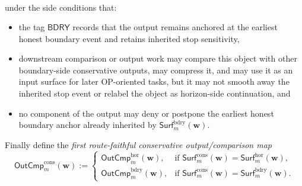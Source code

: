 \begin{definition}
\begin{enumerate}[label=(\roman*)]
\[\begin{aligned}
 \end{aligned}
 \]
 under the side conditions that:
 \begin{itemize}[leftmargin=2em]
 \item the tag \(\mathsf{BDRY}\) records that the output remains anchored at the earliest honest boundary event and retains inherited stop sensitivity,
 \item downstream comparison or output work may compare this object with other boundary-side conservative outputs, may compress it, and may use it as an input surface for later OP-oriented tasks, but it may not smooth away the inherited stop event or relabel the object as horizon-side continuation, and
 \item no component of the output may deny or postpone the earliest honest boundary anchor already inherited by \(\mathsf{Surf}^{\mathrm{bdry}}_{m}(\mathbf w)\).
 \end{itemize}
\end{enumerate}
Finally define the \emph{first route-faithful conservative output/comparison map}
\[
 \mathsf{OutCmp}^{\mathrm{cons}}_{m}(\mathbf w)
 :=
 \begin{cases}
 \mathsf{OutCmp}^{\mathrm{hor}}_{m}(\mathbf w), & \text{if }\mathsf{Surf}^{\mathrm{cons}}_{m}(\mathbf w)=\mathsf{Surf}^{\mathrm{hor}}_{m}(\mathbf w),\\[2mm]
 \mathsf{OutCmp}^{\mathrm{bdry}}_{m}(\mathbf w), & \text{if }\mathsf{Surf}^{\mathrm{cons}}_{m}(\mathbf w)=\mathsf{Surf}^{\mathrm{bdry}}_{m}(\mathbf w).
 \end{cases}
\]
\end{definition}

